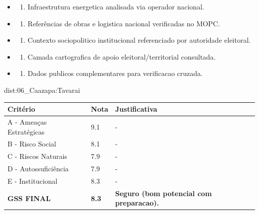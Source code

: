 {\begin{itemize}
\item
  \begin{enumerate}
  \def\labelenumi{\arabic{enumi})}
  \setcounter{enumi}{7}
  \tightlist
  \item
    Infraestrutura energetica analisada via operador nacional.
  \end{enumerate}
\item
  \begin{enumerate}
  \def\labelenumi{\arabic{enumi})}
  \setcounter{enumi}{8}
  \tightlist
  \item
    Referências de obras e logistica nacional verificadas no MOPC.
  \end{enumerate}
\item
  \begin{enumerate}
  \def\labelenumi{\arabic{enumi})}
  \setcounter{enumi}{9}
  \tightlist
  \item
    Contexto sociopolitico institucional referenciado por autoridade
    eleitoral.
  \end{enumerate}
\item
  \begin{enumerate}
  \def\labelenumi{\arabic{enumi})}
  \setcounter{enumi}{10}
  \tightlist
  \item
    Camada cartografica de apoio eleitoral/\allowbreak territorial consultada.
  \end{enumerate}
\item
  \begin{enumerate}
  \def\labelenumi{\arabic{enumi})}
  \setcounter{enumi}{11}
  \tightlist
  \item
    Dados publicos complementares para verificacao cruzada.
  \end{enumerate}
\end{itemize}}{dist:06_Caazapa:Tavarai}
\begin{table}[ht!]
\small \begin{tabular}{p{3.0cm}p{0.8cm}p{6.0cm}} \toprule
\textbf{Critério} & \textbf{Nota} & \textbf{Justificativa} \\ \midrule
A - Ameaças Estratégicas & 9.1 & - \\
B - Risco Social & 8.1 & - \\
C - Riscos Naturais & 7.9 & - \\
D - Autossuficiência & 7.9 & - \\
E - Institucional & 8.3 & - \\
\midrule \textbf{GSS FINAL} & \textbf{8.3} & \textbf{Seguro (bom potencial com preparacao).} \\ \bottomrule \end{tabular}
\end{table}
